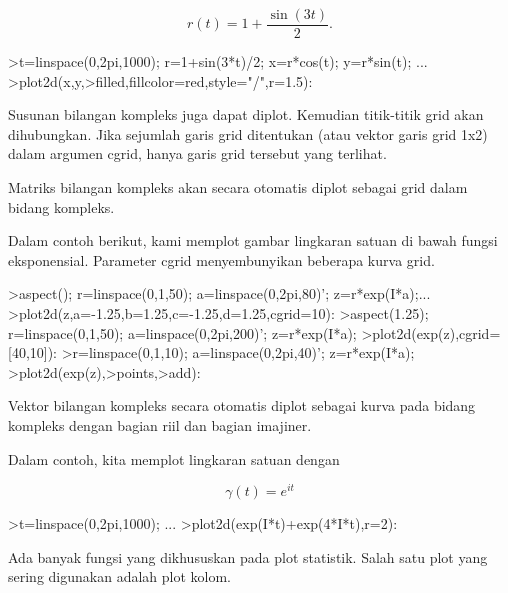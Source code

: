 \documentclass[a4paper,10pt]{article}
\begin{document}
\begin{eulernotebook}
\begin{eulercomment}
\begin{eulercomment}
\begin{eulercomment}
\begin{eulercomment}
\begin{eulercomment}
\begin{eulercomment}
\begin{eulercomment}
\begin{eulercomment}
\begin{eulercomment}
\begin{eulercomment}
\begin{eulercomment}
\begin{eulercomment}
\begin{eulercomment}
\end{eulercomment}
\begin{eulerformula}
\[
r(t) = 1 + \dfrac{\sin(3t)}{2}.
\]
\end{eulerformula}
\begin{eulerprompt}
>t=linspace(0,2pi,1000); r=1+sin(3*t)/2; x=r*cos(t); y=r*sin(t); ...
>plot2d(x,y,>filled,fillcolor=red,style="/",r=1.5):
\end{eulerprompt}
\begin{eulercomment}
Susunan bilangan kompleks juga dapat diplot. Kemudian titik-titik grid
akan dihubungkan. Jika sejumlah garis grid ditentukan (atau vektor
garis grid 1x2) dalam argumen cgrid, hanya garis grid tersebut yang
terlihat.

Matriks bilangan kompleks akan secara otomatis diplot sebagai grid
dalam bidang kompleks.

Dalam contoh berikut, kami memplot gambar lingkaran satuan di bawah
fungsi eksponensial. Parameter cgrid menyembunyikan beberapa kurva
grid.
\end{eulercomment}
\begin{eulerprompt}
>aspect(); r=linspace(0,1,50); a=linspace(0,2pi,80)'; z=r*exp(I*a);...
>plot2d(z,a=-1.25,b=1.25,c=-1.25,d=1.25,cgrid=10):
>aspect(1.25); r=linspace(0,1,50); a=linspace(0,2pi,200)'; z=r*exp(I*a);
>plot2d(exp(z),cgrid=[40,10]):
>r=linspace(0,1,10); a=linspace(0,2pi,40)'; z=r*exp(I*a);
>plot2d(exp(z),>points,>add):
\end{eulerprompt}
\begin{eulercomment}
Vektor bilangan kompleks secara otomatis diplot sebagai kurva pada
bidang kompleks dengan bagian riil dan bagian imajiner.

Dalam contoh, kita memplot lingkaran satuan dengan

\end{eulercomment}
\begin{eulerformula}
\[
\gamma(t) = e^{it}
\]
\end{eulerformula}
\begin{eulerprompt}
>t=linspace(0,2pi,1000); ...
>plot2d(exp(I*t)+exp(4*I*t),r=2):
\end{eulerprompt}
\begin{eulercomment}
Ada banyak fungsi yang dikhususkan pada plot statistik. Salah satu
plot yang sering digunakan adalah plot kolom.


\end{eulercomment}
\end{eulercomment}
\end{eulercomment}
\end{eulercomment}
\end{eulercomment}
\end{eulercomment}
\end{eulercomment}
\end{eulercomment}
\end{eulercomment}
\end{eulercomment}
\end{eulercomment}
\end{eulercomment}
\end{eulercomment}
\end{eulernotebook}
\end{document}
